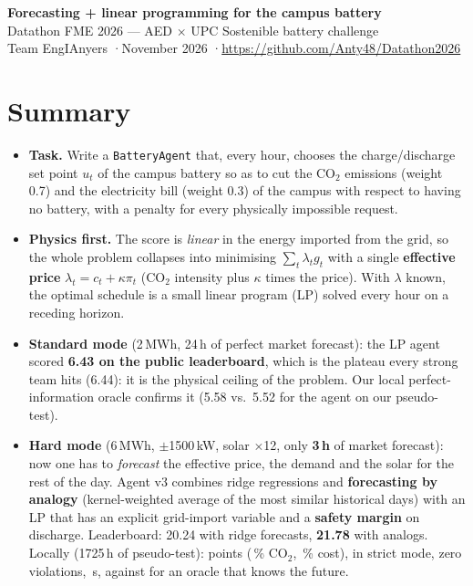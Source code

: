 \documentclass[11pt,a4paper]{article}
\begin{document}
\begin{center}
{\LARGE\bfseries Forecasting + linear programming for the campus battery}\\[4pt]
{\large Datathon FME 2026 --- AED $\times$ UPC Sostenible battery challenge}\\[3pt]
{\small Team EngIAnyers \quad·\quad November 2026 \quad·\quad \url{https://github.com/Anty48/Datathon2026}}
\end{center}

\section*{Summary}
\begin{itemize}
  \item \textbf{Task.} Write a \texttt{BatteryAgent} that, every hour, chooses the charge/discharge set point $u_t$ of the campus battery so as to cut the CO$_2$ emissions (weight 0.7) and the electricity bill (weight 0.3) of the campus with respect to having no battery, with a penalty for every physically impossible request.
  \item \textbf{Physics first.} The score is \emph{linear} in the energy imported from the grid, so the whole problem collapses into minimising $\sum_t\lambda_t g_t$ with a single \textbf{effective price} $\lambda_t=c_t+\kappa\pi_t$ (CO$_2$ intensity plus $\kappa$ times the price). With $\lambda$ known, the optimal schedule is a small linear program (LP) solved every hour on a receding horizon.
  \item \textbf{Standard mode} (2\,MWh, 24\,h of perfect market forecast): the LP agent scored \textbf{6.43 on the public leaderboard}, which is the plateau every strong team hits (6.44): it is the physical ceiling of the problem. Our local perfect-information oracle confirms it (5.58 vs.\ 5.52 for the agent on our pseudo-test).
  \item \textbf{Hard mode} (6\,MWh, $\pm$1500\,kW, solar $\times$12, only \textbf{3\,h} of market forecast): now one has to \emph{forecast} the effective price, the demand and the solar for the rest of the day. Agent v3 combines ridge regressions and \textbf{forecasting by analogy} (kernel-weighted average of the most similar historical days) with an LP that has an explicit grid-import variable and a \textbf{safety margin} on discharge. Leaderboard: 20.24 with ridge forecasts, \textbf{21.78} with analogs. Locally (1725\,h of pseudo-test): \textbf{\scoreFinal{}} points (\coFinal\,\% CO$_2$, \costFinal\,\% cost), \scoreStrict{} in strict mode, zero violations, \timeFinal\,s, against \scoreOracle{} for an oracle that knows the future.
\end{itemize}
\end{document}
